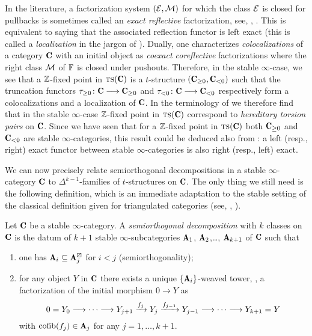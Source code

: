\begin{remark}\label{oss.hereditary}
In the literature, a factorization system $(\mathcal{E},\mathcal{M})$ for which the class $\mathcal{E}$ is closed for pullbacks is sometimes called an \emph{exact reflective} factorization, see, \eg, \cite{CHK}. This is equivalent to saying that the associated reflection functor is left exact (this is called a \emph{localization} in the jargon of \cite{CHK}). Dually,  one characterizes \emph{colocalizations} of a category $\C$ with an initial object as \emph{coexact coreflective} factorizations where the right class $\mathcal{M}$ of $\mathbb{F}$ is closed under pushouts.  Therefore, in the stable $\infty$-case, we see that a $\mathbb{Z} $-fixed point in $\ts(\C)$ is a $t$-structure $(\C_{\geq 0},\C_{<0})$ such that the truncation functors $\tau_{\ge 0}\colon \C\to \C_{\ge 0}$ and $\tau_{<0}\colon \C\to \C_{<0}$ respectively form a colocalizations and a localization of $\C$. In the terminology of \cite{Beligiannisreiten} we therefore find that in the stable $\infty$-case $\mathbb{Z} $-fixed point in $\ts(\C)$ correspond to \emph{hereditary torsion pairs} on $\C$. Since we have seen that for a $\mathbb{Z} $-fixed point in $\ts(\C)$ both $\C_{\geq 0}$ and $\C_{<0}$ are stable $\infty$-categories, this result could be deduced also from \cite[Prop. \textbf{1.1.4.1}]{LurieHA}: a left (resp., right) exact functor between stable $\infty$-categories is also right (resp., left) exact.
 \end{remark}
We can now precisely relate semiorthogonal decompositions in a stable $\infty$-category $\C$ to $\Delta^{k-1}$-families of $t$-structures on $\C$. The only thing we still need is the following definition, which is an immediate adaptation to the stable setting of the classical definition given for triangulated categories (see, \eg, \cite{Bondal1995, Kuz} ).
\begin{definition}
Let $\C$ be a stable $\infty$-category. A \emph{semiorthogonal decomposition} with $k$ classes on $\C$ is the datum of $k+1$ stable $\infty$-subcategories $\cate{A}_1$, $\cate{A}_2$,\dots, $\cate{A}_{k+1}$ of $\C$ such that
\begin{enumerate}
\item one has $\cate{A}_i\subseteq \cate{A}_j^\orth$ for $i<j$ (semiorthogonality);
\item for any object $Y$ in $\C$ there exists a unique $\{\cate{A}_i\}$-weaved tower, \ie, a factorization of the initial morphism $0\to Y$ as 
\[
0 =Y_0\longrightarrow\cdots \longrightarrow Y_{j+1} \xrightarrow{f_{j}} Y_{j} \xrightarrow{f_{j-1}}Y_{j-1}\longrightarrow \cdots\longrightarrow Y_{k+1}=Y
\]
with $\cofib(f_j)\in \cate{A}_j$ for any $j=1,\dots, k+1$. 
\end{enumerate} 
\end{definition}
